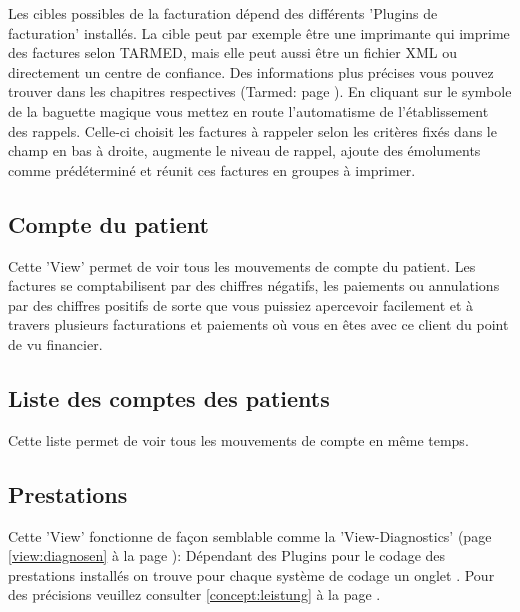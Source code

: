 Les cibles possibles de la facturation dépend des différents 'Plugins de facturation' installés.
La cible peut par exemple être une imprimante qui imprime des factures selon TARMED, mais elle peut aussi être un fichier XML ou directement un centre de confiance. Des informations plus précises vous pouvez trouver dans les chapitres respectives  (Tarmed: page \pageref{arzttarife}).
\bigskip
En cliquant sur le symbole de la baguette magique vous mettez en route l'automatisme de l'établissement des rappels. Celle-ci choisit les factures à rappeler selon les critères fixés dans le champ en bas à droite, augmente le niveau de rappel, ajoute des émoluments comme prédéterminé et réunit ces factures en groupes  \glqq à imprimer\grqq{}.

\subsection{Compte du patient}
Cette 'View' permet de voir tous les mouvements de compte du patient. Les factures se comptabilisent par des chiffres négatifs, les paiements ou annulations par des chiffres positifs de sorte que vous puissiez apercevoir facilement et à travers plusieurs facturations et paiements où vous en êtes avec ce client du point de vu financier.

\subsection{Liste des comptes des patients}
Cette liste permet de voir tous les mouvements de compte en même temps.

\subsection{Prestations}
Cette 'View' fonctionne de façon semblable comme la 'View-Diagnostics'  (page \ref{view:diagnosen} à la page \pageref{view:diagnosen}): Dépendant des Plugins pour le codage des prestations installés on trouve pour chaque système de codage un onglet . Pour des précisions veuillez consulter \ref{concept:leistung} à la page \pageref{concept:leistung}.



